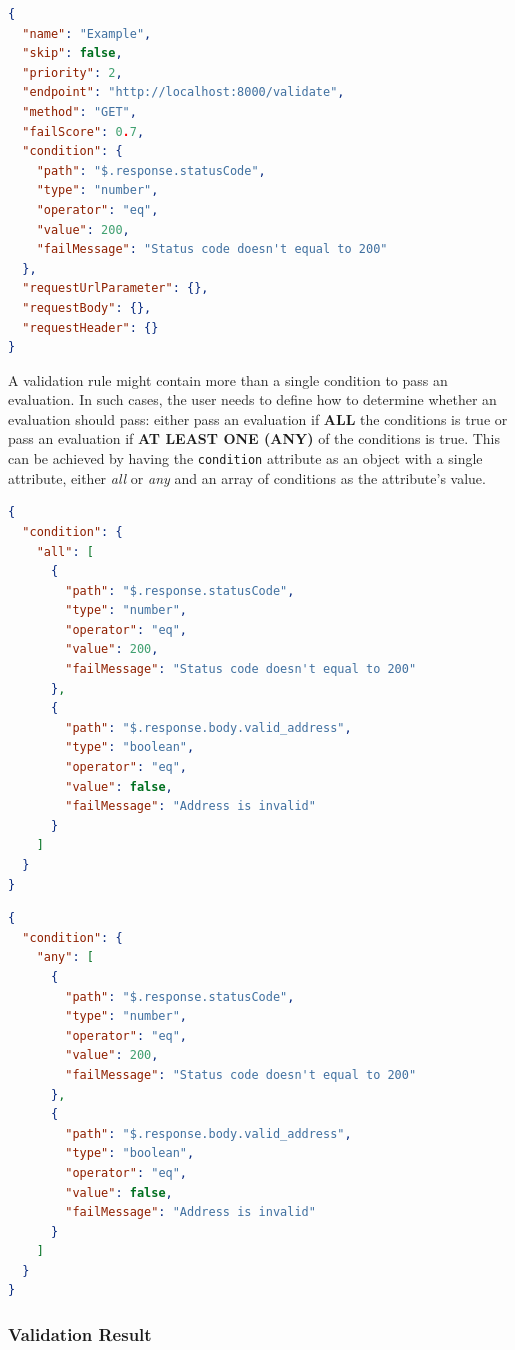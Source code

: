     \newpage
    \begin{lstlisting}[caption={Validation rule example (JSON)}, language=json]
{
  "name": "Example",
  "skip": false,
  "priority": 2,
  "endpoint": "http://localhost:8000/validate",
  "method": "GET",
  "failScore": 0.7,
  "condition": {
    "path": "$.response.statusCode",
    "type": "number",
    "operator": "eq",
    "value": 200,
    "failMessage": "Status code doesn't equal to 200"
  },
  "requestUrlParameter": {},
  "requestBody": {},
  "requestHeader": {}
}
    \end{lstlisting}

    A validation rule might contain more than a single condition to pass an evaluation. In such cases, the user needs to define how to determine whether an evaluation should pass: either pass an evaluation if \textbf{ALL} the conditions is true or pass an evaluation if \textbf{AT LEAST ONE (ANY)} of the conditions is true. This can be achieved by having the \verb;condition; attribute as an object with a single attribute, either \emph{all} or \emph{any} and an array of conditions as the attribute's value.

    \begin{lstlisting}[caption={Validation rule \textbf{condition} attribute example with ALL condition (JSON)}, language=json]
{
  "condition": {
    "all": [
      {
        "path": "$.response.statusCode",
        "type": "number",
        "operator": "eq",
        "value": 200,
        "failMessage": "Status code doesn't equal to 200"
      },
      {
        "path": "$.response.body.valid_address",
        "type": "boolean",
        "operator": "eq",
        "value": false,
        "failMessage": "Address is invalid"
      }
    ]
  }
}
    \end{lstlisting}

    \begin{lstlisting}[caption={Validation rule \textbf{condition} attribute example with ANY condition (JSON)}, language=json]
{
  "condition": {
    "any": [
      {
        "path": "$.response.statusCode",
        "type": "number",
        "operator": "eq",
        "value": 200,
        "failMessage": "Status code doesn't equal to 200"
      },
      {
        "path": "$.response.body.valid_address",
        "type": "boolean",
        "operator": "eq",
        "value": false,
        "failMessage": "Address is invalid"
      }
    ]
  }
}
    \end{lstlisting}

  \subsubsection{Validation Result}

